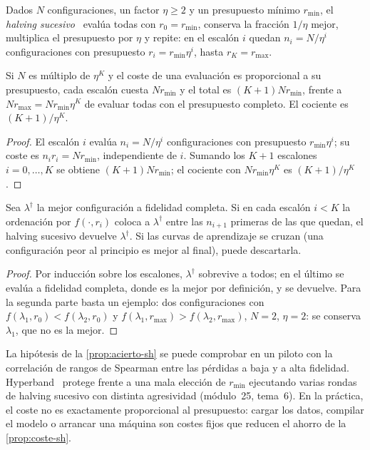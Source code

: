 \begin{definicion}\label{def:sh}
Dados $N$ configuraciones, un factor $\eta\ge2$ y un presupuesto mínimo $r_{\min}$, el \emph{halving sucesivo}~\cite{sh} evalúa todas con $r_0=r_{\min}$, conserva la fracción $1/\eta$ mejor, multiplica el presupuesto por $\eta$ y repite: en el escalón $i$ quedan $n_i=N/\eta^{i}$ configuraciones con presupuesto $r_i=r_{\min}\eta^{i}$, hasta $r_K=r_{\max}$.
\end{definicion}

\begin{proposicion}\label{prop:coste-sh}
Si $N$ es múltiplo de $\eta^{K}$ y el coste de una evaluación es proporcional a su presupuesto, cada escalón cuesta $N r_{\min}$ y el total es $(K+1)Nr_{\min}$, frente a $Nr_{\max}=N r_{\min}\eta^{K}$ de evaluar todas con el presupuesto completo. El cociente es $(K+1)/\eta^{K}$.
\end{proposicion}

\begin{proof}
El escalón $i$ evalúa $n_i=N/\eta^{i}$ configuraciones con presupuesto $r_{\min}\eta^{i}$; su coste es $n_ir_i=Nr_{\min}$, independiente de $i$. Sumando los $K+1$ escalones $i=0,\dots,K$ se obtiene $(K+1)Nr_{\min}$; el cociente con $Nr_{\min}\eta^{K}$ es $(K+1)/\eta^{K}$.
\end{proof}

\begin{proposicion}\label{prop:acierto-sh}
Sea $\lambda^{\dagger}$ la mejor configuración a fidelidad completa. Si en cada escalón $i<K$ la ordenación por $f(\cdot,r_i)$ coloca a $\lambda^{\dagger}$ entre las $n_{i+1}$ primeras de las que quedan, el halving sucesivo devuelve $\lambda^{\dagger}$. Si las curvas de aprendizaje se cruzan (una configuración peor al principio es mejor al final), puede descartarla.
\end{proposicion}

\begin{proof}
Por inducción sobre los escalones, $\lambda^{\dagger}$ sobrevive a todos; en el último se evalúa a fidelidad completa, donde es la mejor por definición, y se devuelve. Para la segunda parte basta un ejemplo: dos configuraciones con $f(\lambda_1,r_0)<f(\lambda_2,r_0)$ y $f(\lambda_1,r_{\max})>f(\lambda_2,r_{\max})$, $N=2$, $\eta=2$: se conserva $\lambda_1$, que no es la mejor.
\end{proof}

La hipótesis de la \cref{prop:acierto-sh} se puede comprobar en un piloto con la correlación de rangos de Spearman entre las pérdidas a baja y a alta fidelidad. Hyperband~\cite{hyperband} protege frente a una mala elección de $r_{\min}$ ejecutando varias rondas de halving sucesivo con distinta agresividad (módulo~25, tema~6). En la práctica, el coste no es exactamente proporcional al presupuesto: cargar los datos, compilar el modelo o arrancar una máquina son costes fijos que reducen el ahorro de la \cref{prop:coste-sh}.

